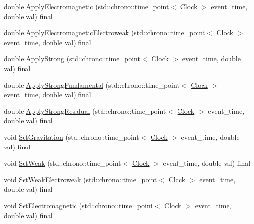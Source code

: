 \begin{DoxyCompactItemize}
\item 
double \hyperlink{class_cognitive_network_ae590ecb77db0a876425b9b74bcfe2bce}{Apply\+Electromagnetic} (std\+::chrono\+::time\+\_\+point$<$ \hyperlink{universe_8h_a0ef8d951d1ca5ab3cfaf7ab4c7a6fd80}{Clock} $>$ event\+\_\+time, double val) final
\item 
double \hyperlink{class_cognitive_network_a9753f52c9e36ad44e9fac1d3e38a0770}{Apply\+Electromagnetic\+Electroweak} (std\+::chrono\+::time\+\_\+point$<$ \hyperlink{universe_8h_a0ef8d951d1ca5ab3cfaf7ab4c7a6fd80}{Clock} $>$ event\+\_\+time, double val) final
\item 
double \hyperlink{class_cognitive_network_a7a55750d3c42a277c4ffe04a87ab3b19}{Apply\+Strong} (std\+::chrono\+::time\+\_\+point$<$ \hyperlink{universe_8h_a0ef8d951d1ca5ab3cfaf7ab4c7a6fd80}{Clock} $>$ event\+\_\+time, double val) final
\item 
double \hyperlink{class_cognitive_network_af25bbd4f4d8f370cd2a48fd6db8302b9}{Apply\+Strong\+Fundamental} (std\+::chrono\+::time\+\_\+point$<$ \hyperlink{universe_8h_a0ef8d951d1ca5ab3cfaf7ab4c7a6fd80}{Clock} $>$ event\+\_\+time, double val) final
\item 
double \hyperlink{class_cognitive_network_a8b60fdb81d89a3a74d6c06cb29e7aad3}{Apply\+Strong\+Residual} (std\+::chrono\+::time\+\_\+point$<$ \hyperlink{universe_8h_a0ef8d951d1ca5ab3cfaf7ab4c7a6fd80}{Clock} $>$ event\+\_\+time, double val) final
\item 
void \hyperlink{class_cognitive_network_af9f082a70f0cc25a3f818d9eace5a527}{Set\+Gravitation} (std\+::chrono\+::time\+\_\+point$<$ \hyperlink{universe_8h_a0ef8d951d1ca5ab3cfaf7ab4c7a6fd80}{Clock} $>$ event\+\_\+time, double val) final
\item 
void \hyperlink{class_cognitive_network_ab39c9eed50da6d3630c4498ae64b804e}{Set\+Weak} (std\+::chrono\+::time\+\_\+point$<$ \hyperlink{universe_8h_a0ef8d951d1ca5ab3cfaf7ab4c7a6fd80}{Clock} $>$ event\+\_\+time, double val) final
\item 
void \hyperlink{class_cognitive_network_a116f6818986a622e4a318857859e2495}{Set\+Weak\+Electroweak} (std\+::chrono\+::time\+\_\+point$<$ \hyperlink{universe_8h_a0ef8d951d1ca5ab3cfaf7ab4c7a6fd80}{Clock} $>$ event\+\_\+time, double val) final
\item 
void \hyperlink{class_cognitive_network_a31764cd5746369d16b45f2ff74806a0b}{Set\+Electromagnetic} (std\+::chrono\+::time\+\_\+point$<$ \hyperlink{universe_8h_a0ef8d951d1ca5ab3cfaf7ab4c7a6fd80}{Clock} $>$ event\+\_\+time, double val) final
\item 

\end{DoxyCompactItemize}
